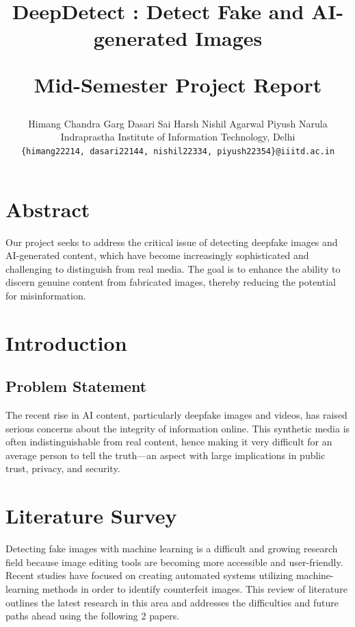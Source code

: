 \documentclass[10pt,twocolumn,letterpaper]{article}
\begin{document}
\title{\begin{center}
    DeepDetect : Detect Fake and AI-generated Images
\end{center}
Mid-Semester Project Report}

\author{Himang Chandra Garg \qquad Dasari Sai Harsh \qquad Nishil Agarwal \qquad Piyush Narula\\
Indraprastha Institute of Information Technology, Delhi\\
{\tt\small \{himang22214, dasari22144, nishil22334, piyush22354\}@iiitd.ac.in}
}

\maketitle

\pagestyle{empty}


\section{Abstract}

Our project seeks to address the critical issue of detecting deepfake images and AI-generated content, which have become increasingly sophisticated and challenging to distinguish from real media. 
The goal is to enhance the ability to discern genuine content from fabricated images, thereby reducing the potential for misinformation.

\section{Introduction}

\subsection{Problem Statement}

The recent rise in AI content, particularly deepfake images and videos, has raised serious concerns about the integrity of information online. 
This synthetic media is often indistinguishable from real content, hence making it very difficult for an average person to tell the truth—an aspect with large implications in public trust, privacy, and security.

\section{Literature Survey}
Detecting fake images with machine learning is a difficult and growing research field because image editing tools are becoming more accessible and user-friendly. Recent studies have focused on creating automated systems utilizing machine-learning methods in order to identify counterfeit images. This review of literature outlines the latest research in this area and addresses the difficulties and future paths ahead using the following 2 papers.
\end{document}
